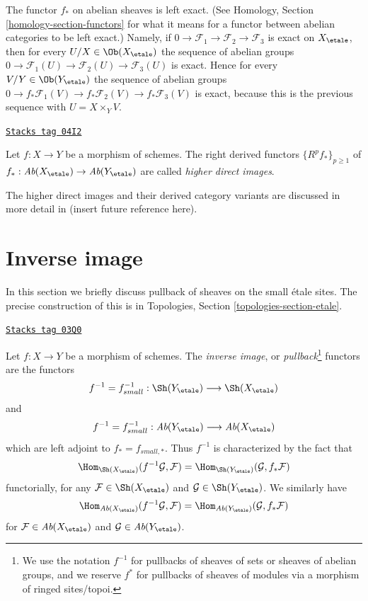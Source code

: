 \medskip\noindent
The functor $f_*$ on abelian sheaves is left exact. (See
Homology, Section \ref{homology-section-functors}
for what it means for a functor between abelian categories to be left exact.)
Namely, if
$0 \to \mathcal{F}_1 \to \mathcal{F}_2 \to \mathcal{F}_3$
is exact on $X_\etale$, then for every
$U/X \in \Ob(X_\etale)$
the sequence of abelian groups
$0 \to \mathcal{F}_1(U) \to \mathcal{F}_2(U) \to \mathcal{F}_3(U)$
is exact. Hence for every $V/Y \in \Ob(Y_\etale)$
the sequence of abelian groups
$0 \to f_*\mathcal{F}_1(V) \to f_*\mathcal{F}_2(V) \to f_*\mathcal{F}_3(V)$
is exact, because this is the previous sequence with $U = X \times_Y V$.

\begin{definition}
\label{etale-cohomology-definition-higher-direct-images}
\href{https://stacks.math.columbia.edu/tag/04I2}{\texttt{Stacks tag 04I2}}

Let $f: X \to Y$ be a morphism of schemes.
The right derived functors $\{R^pf_*\}_{p \geq 1}$ of
$f_* : \textit{Ab}(X_\etale) \to \textit{Ab}(Y_\etale)$
are called {\it higher direct images}.
\end{definition}

The higher direct images and their derived category variants are
discussed in more detail in (insert future reference here).

\section{Inverse image}
\label{etale-cohomology-section-inverse-image}
In this section we briefly discuss pullback of sheaves on the small
\'etale sites. The precise construction of this is in
Topologies, Section \ref{topologies-section-etale}.

\begin{definition}
\label{etale-cohomology-definition-inverse-image}
\href{https://stacks.math.columbia.edu/tag/03Q0}{\texttt{Stacks tag 03Q0}}

Let $f: X\to Y$ be a morphism of schemes. The {\it inverse image}, or
{\it pullback}\footnote{We use the notation $f^{-1}$ for pullbacks of
sheaves of sets or sheaves of abelian groups, and we reserve $f^*$ for
pullbacks of sheaves of modules via a morphism of ringed sites/topoi.}
functors are the functors
$$
f^{-1} = f_{small}^{-1} :
\Sh(Y_\etale)
\longrightarrow
\Sh(X_\etale)
$$
and
$$
f^{-1} = f_{small}^{-1} :
\textit{Ab}(Y_\etale)
\longrightarrow
\textit{Ab}(X_\etale)
$$
which are left adjoint to $f_* = f_{small, *}$. Thus
$f^{-1}$ is characterized by the fact that
$$
\Hom_{{\Sh(X_\etale)}} (f^{-1}\mathcal{G}, \mathcal{F})
=
\Hom_{\Sh(Y_\etale)} (\mathcal{G}, f_*\mathcal{F})
$$
functorially, for any $\mathcal{F} \in \Sh(X_\etale)$ and
$\mathcal{G} \in \Sh(Y_\etale)$. We similarly have
$$
\Hom_{{\textit{Ab}(X_\etale)}} (f^{-1}\mathcal{G}, \mathcal{F})
=
\Hom_{\textit{Ab}(Y_\etale)} (\mathcal{G}, f_*\mathcal{F})
$$
for $\mathcal{F} \in \textit{Ab}(X_\etale)$ and
$\mathcal{G} \in \textit{Ab}(Y_\etale)$.
\end{definition}


